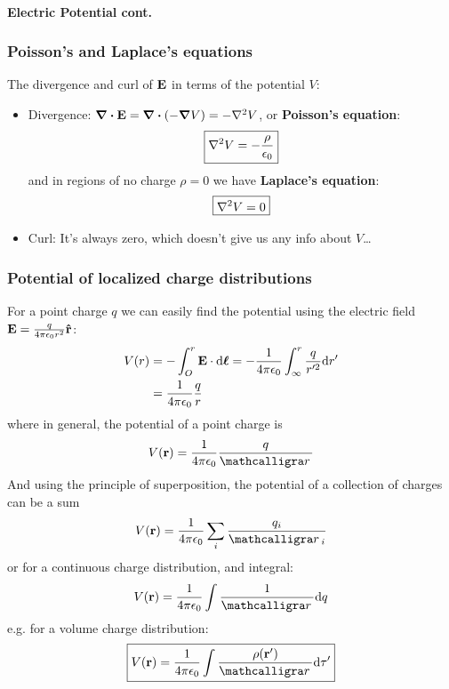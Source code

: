 \documentclass[../main.tex]{subfiles}
\begin{document}
\newpage
{}
\paragraph*{Electric Potential cont.}

\subsubsection{Poisson's and Laplace's equations} The divergence and curl of $\vb E$ in terms of the potential $V$:

\begin{itemize}
    \item Divergence: \(\div \vb E = \div (-\grad V) = -\laplacian V\), or \textbf{Poisson's equation}:
    \begin{align*}
        \boxed{\laplacian V = -\frac{\rho}{\epsilon_0}}
    \end{align*}
    and in regions of no charge $\rho = 0$ we have \textbf{Laplace's equation}:
    \[\boxed{\laplacian V = 0}\]
    \item Curl: It's always zero, which doesn't give us any info about $V$\dots
\end{itemize}

\subsubsection{Potential of localized charge distributions}

For a point charge $q$ we can easily find the potential using the electric field $\vb E = \frac{q}{4\pi\epsilon_0 r^2} \vu r$:
\begin{align*}
    V(r) &= -\int_O^r \vb E \cdot \dd \vb*\ell = - \frac{1}{4\pi\epsilon_0} \int_\infty^r \frac{q}{r'^2} \dd r'\\
    &= \frac{1}{4\pi\epsilon_0} \frac{q}{r}
\end{align*}
where in general, the potential of a point charge is
\begin{align*}
    V(\vb r) = \ke \frac{q}{\scriptr}
\end{align*}
And using the principle of superposition, the potential of a collection of charges can be a sum
\begin{align*}
    V(\vb r) = \ke \sum_i \frac{q_i}{\scriptr_i}
\end{align*}
or for a continuous charge distribution, and integral:
\begin{align*}
    V(\vb r) = \ke \int \frac{1}{\scriptr} \dd q
\end{align*}
e.g. for a volume charge distribution:
\begin{align*}
    \boxed{
        V(\vb r) = \ke \int \frac{\rho(\vb r')}{\scriptr} \dd \tau'
    }
\end{align*}
\end{document}
